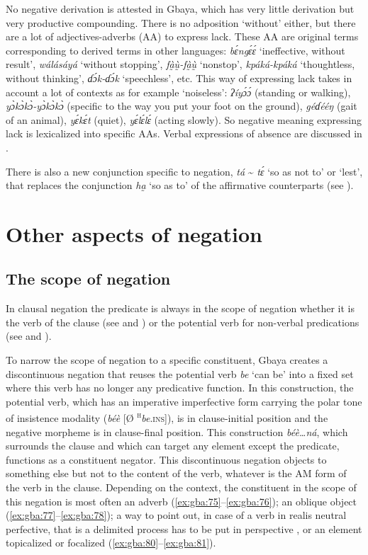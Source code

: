 \documentclass[output=paper,colorlinks=true, citecolor=brown]{langscibook}
\begin{document}
No negative derivation is attested in Gbaya, which has very little derivation but very productive compounding. There is no adposition ‘without’ either, but there are a lot of adjectives-adverbs (AA) to express lack. These AA are original terms corresponding to derived terms in other languages: \textit{bɛ́ngɛ́ɛ́} ‘ineffective, without result’, \textit{wálásáyá} ‘without stopping’, \textit{fà̰ṵ̀-fà̰ṵ̀} ‘nonstop’, \textit{kpáká-kpáká} ‘thoughtless, without thinking’, \textit{ɗɔ́k-ɗɔ́k} ‘speechless’, etc. This way of expressing lack takes in account a lot of contexts as for example ‘noiseless’: \textit{ʔíyɔ́ɔ́} (standing or walking), \textit{yɔ̀kɔ̀kɔ̀-yɔ̀kɔ̀kɔ̀} (specific to the way you put your foot on the ground), \textit{géɗééŋ} (gait of an animal), \textit{yɛ́kɛ́t} (quiet), \textit{yɛ́lɛ́lɛ́} (acting slowly). So negative meaning expressing lack is lexicalized into specific AAs. Verbal expressions of absence are discussed in .

There is also a new conjunction specific to negation, \textit{tá} {\textasciitilde} \textit{tɛ́} ‘so as not to’ or ‘lest’, that replaces the conjunction \textit{ha̰} ‘so as to’ of the affirmative counterparts (see ).

\section{Other aspects of negation}\label{sec:gba:4}

\subsection{The scope of negation}\label{sec:gba:4.1}

In clausal negation the predicate is always in the scope of negation whether it is the verb of the clause (see  and ) or the potential verb for non-verbal predications (see  and ).

To narrow the scope of negation to a specific constituent, Gbaya creates a discontinuous negation that reuses the potential verb \textit{be} ‘can be’ into a fixed set where this verb has no longer any predicative function. In this construction, the potential verb, which has an imperative imperfective form carrying the polar tone of insistence modality (\textit{béè} [Ø \textsuperscript{\textsc{h}}\textit{be}.\textsc{ins]}), is in clause-initial position and the negative morpheme is in clause-final position. This construction \textit{béè…ná}, which surrounds the clause and which can target any element except the predicate, functions as a constituent negator. This discontinuous negation objects to something else but not to the content of the verb, whatever is the AM form of the verb in the clause. Depending on the context, the constituent in the scope of this negation is most often an adverb (\ref{ex:gba:75}--\ref{ex:gba:76}); an oblique object (\ref{ex:gba:77}--\ref{ex:gba:78}); a way to point out, in case of a verb in realis neutral perfective, that is a delimited process has to be put in perspective , or an element topicalized or focalized (\ref{ex:gba:80}--\ref{ex:gba:81}).
\end{document}
